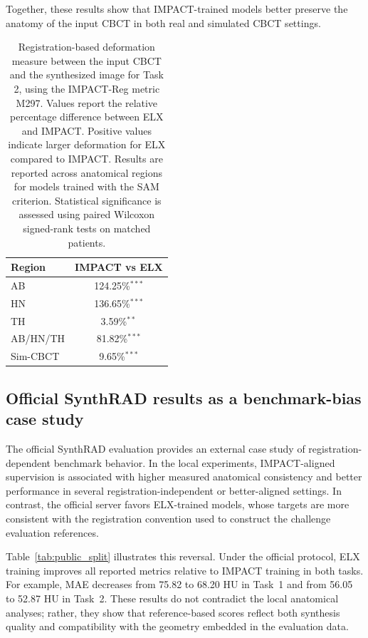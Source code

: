 \documentclass[lettersize,journal]{IEEEtran}
\begin{document}
Together, these results show that IMPACT-trained models better preserve the anatomy of the input CBCT in both real and simulated CBCT settings.

\begin{table}[h!]
\centering
\footnotesize
\setlength{\tabcolsep}{6pt}
\renewcommand{\arraystretch}{1.25}
\caption{Registration-based deformation measure between the input CBCT and the synthesized image for Task 2, using the IMPACT-Reg metric M297. Values report the relative percentage difference between ELX and IMPACT. Positive values indicate larger deformation for ELX compared to IMPACT. Results are reported across anatomical regions for models trained with the SAM criterion. Statistical significance is assessed using paired Wilcoxon signed-rank tests on matched patients.
}
\label{tab:task2_cv_0_reg_reg_region_metrics}
\begin{tabular}{lc}
\toprule
Region & IMPACT vs ELX \\
\midrule
AB  & 124.25\%$^{***}$ \\
HN & 136.65\%$^{***}$ \\
TH  & 3.59\%$^{**}$ \\
AB/HN/TH & 81.82\%$^{***}$ \\
\addlinespace[0.25em]
\hline
\hline
\addlinespace[0.25em]
Sim-CBCT  & 9.65\%$^{***}$ \\
\bottomrule
\end{tabular}

\end{table}
\renewcommand{\arraystretch}{1}

\subsection{Official SynthRAD results as a benchmark-bias case study}

The official SynthRAD evaluation provides an external case study of registration-dependent benchmark behavior. In the local experiments, IMPACT-aligned supervision is associated with higher measured anatomical consistency and better performance in several registration-independent or better-aligned settings. In contrast, the official server favors ELX-trained models, whose targets are more consistent with the registration convention used to construct the challenge evaluation references.

Table~\ref{tab:public_split} illustrates this reversal. Under the official protocol, ELX training improves all reported metrics relative to IMPACT training in both tasks. For example, MAE decreases from 75.82 to 68.20 HU in Task~1 and from 56.05 to 52.87 HU in Task~2. These results do not contradict the local anatomical analyses; rather, they show that reference-based scores reflect both synthesis quality and compatibility with the geometry embedded in the evaluation data.
\end{document}
